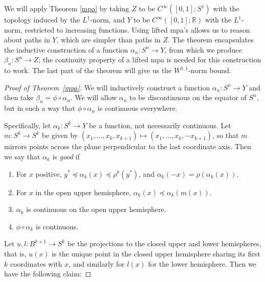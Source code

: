 \documentclass[11pt, reqno, english]{amsart}
\theoremstyle{plain}
\theoremstyle{definition}
\newcommand{\R}{\mathbb{R}}
\begin{document}
We will apply Theorem \ref{mpa} by taking $Z$ to be $C^{\infty}([0, 1]; S^{1})$
with the topology induced by the $L^{1}$-norm, and $Y$ to be $C^{\infty}([0,
1]; \R)$ with the $L^{1}$-norm, restricted to increasing functions. Using
lifted mpa's allows us to reason about paths in $Y$, which are simpler than
paths in $Z$. The theorem encapsulates the inductive construction of a function
$\alpha_{n}\colon S^{n} \rightarrow Y$, from which we produce ${\beta_{n}\colon
S^{n} \rightarrow Z}$; the continuity property of a lifted mpa is needed for
this construction to work. The last part of the theorem will give us the $W^{1,
1}$-norm bound.

\begin{proof}[Proof of Theorem~\ref{mpa}]

  We will inductively construct a function $\alpha_{n}\colon S^{n} \rightarrow
  Y$ and then take $\beta_{n} = \phi \circ \alpha_{n}$. We will allow
  $\alpha_{n}$ to be discontinuous on the equator of $S^{n}$, but in such a way
  that $\phi \circ \alpha_{n}$ is continuous everywhere.
  
  Specifically, let $\alpha_{k}\colon S^{k} \rightarrow Y$ be a function, not
  necessarily continuous. Let $m \colon S^{k} \rightarrow S^{k}$ be given by
  $(x_{1}, \ldots , x_{k}, x_{k+1}) \mapsto (x_{1}, \ldots , x_{k}, -x_{k+1})$,
  so that $m$ mirrors points across the plane perpendicular to the last
  coordinate axis. Then we say that $\alpha_{k}$ is \emph{good} if
  \begin{enumerate}[($\alpha$-1)]
    \item For $x$ positive, $y^{*} \preceq \alpha_{k}(x) \preceq
    \rho^{k}(y^{*})$, and $\alpha_{k}(-x) = \rho(\alpha_{k}(x))$.
    \item For $x$ in the open upper hemisphere, $\alpha_{k}(x) \preceq
    \alpha_{k}(m(x))$.
    \item $\alpha_{k}$ is continuous on the open upper hemisphere.
    \item $\phi \circ \alpha_{k}$ is continuous.
  \end{enumerate}

  Let $u, l \colon B^{k+1} \rightarrow S^{k}$ be the projections to the closed
  upper and lower hemispheres, that is, $u(x)$ is the unique point in the
  closed upper hemisphere sharing its first $k$ coordinates with $x$, and
  similarly for $l(x)$ for the lower hemisphere. Then we have the following
  claim:
  

\end{proof}
\end{document}
